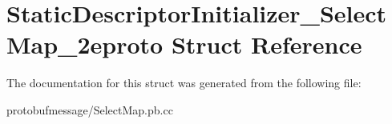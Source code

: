 \hypertarget{struct_static_descriptor_initializer___select_map__2eproto}{\section{Static\-Descriptor\-Initializer\-\_\-\-Select\-Map\-\_\-2eproto Struct Reference}
\label{struct_static_descriptor_initializer___select_map__2eproto}
}


The documentation for this struct was generated from the following file\-:\begin{DoxyCompactItemize}
\item 
protobufmessage/Select\-Map.\-pb.\-cc\end{DoxyCompactItemize}
